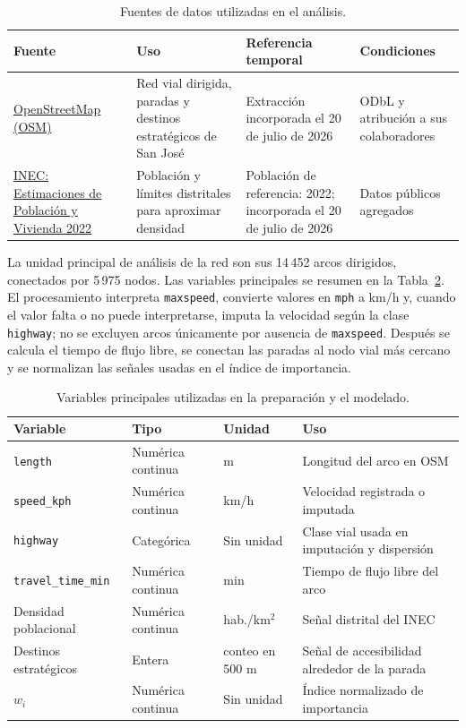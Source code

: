\documentclass[11pt]{article}
\numberwithin{equation}{section}
\begin{document}
\small
\begin{longtable}{p{} p{} p{} p{}}
\caption{Fuentes de datos utilizadas en el análisis.}\label{tab:fuentes_datos}\\
\toprule
\textbf{Fuente} & \textbf{Uso} & \textbf{Referencia temporal} & \textbf{Condiciones} \\
\midrule
\endhead
\href{https://www.openstreetmap.org/copyright}{OpenStreetMap (OSM)} & Red vial dirigida, paradas y destinos estratégicos de San José & Extracción incorporada el 20 de julio de 2026 & ODbL y atribución a sus colaboradores \\
\addlinespace
\href{https://inec.cr/calendario/publicaciones-estadisticas/estimacion-poblacion-vivienda-2022-distribucion-nivel}{INEC: Estimaciones de Población y Vivienda 2022} & Población y límites distritales para aproximar densidad & Población de referencia: 2022; incorporada el 20 de julio de 2026 & Datos públicos agregados \\
\bottomrule
\end{longtable}
\normalsize

La unidad principal de análisis de la red son sus 14\,452 arcos dirigidos, conectados por 5\,975 nodos. Las variables principales se resumen en la Tabla~\ref{tab:variables}. El procesamiento interpreta \texttt{maxspeed}, convierte valores en \texttt{mph} a km/h y, cuando el valor falta o no puede interpretarse, imputa la velocidad según la clase \texttt{highway}; no se excluyen arcos únicamente por ausencia de \texttt{maxspeed}. Después se calcula el tiempo de flujo libre, se conectan las paradas al nodo vial más cercano y se normalizan las señales usadas en el índice de importancia.

\begin{table}[h!]
\centering
\scriptsize
\setlength{\tabcolsep}{3pt}
\begin{tabularx}{\textwidth}{>{\raggedright\arraybackslash}p{} >{\raggedright\arraybackslash}p{} >{\raggedright\arraybackslash}p{} X}
\toprule
\textbf{Variable} & \textbf{Tipo} & \textbf{Unidad} & \textbf{Uso} \\
\midrule
\texttt{length} & Numérica continua & m & Longitud del arco en OSM \\
\texttt{speed\_kph} & Numérica continua & km/h & Velocidad registrada o imputada \\
\texttt{highway} & Categórica & Sin unidad & Clase vial usada en imputación y dispersión \\
\texttt{travel\_time\_min} & Numérica continua & min & Tiempo de flujo libre del arco \\
Densidad poblacional & Numérica continua & hab./km$^2$ & Señal distrital del INEC \\
Destinos estratégicos & Entera & conteo en 500 m & Señal de accesibilidad alrededor de la parada \\
$w_i$ & Numérica continua & Sin unidad & Índice normalizado de importancia \\
\bottomrule
\end{tabularx}
\caption{Variables principales utilizadas en la preparación y el modelado.}
\label{tab:variables}
\end{table}
\end{document}
